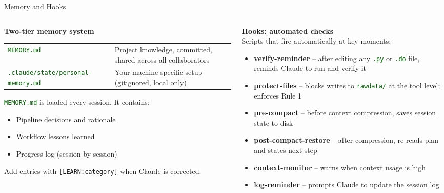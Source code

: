 \documentclass[aspectratio=169,11pt,dvipsnames]{beamer}
\newcommand{\file}[1]{\textcolor{darkgreen}{\nolinkurl{#1}}}
\begin{document}
\begin{frame}{Memory and Hooks}
  \begin{columns}[T]
    \begin{column}{0.48\textwidth}
      \textbf{Two-tier memory system}\\[4pt]
      \begin{tabular}{p{2cm}p{3.5cm}}
        \small\file{MEMORY.md} & \small Project knowledge, committed, shared across all collaborators \\[6pt]
        \small\file{.claude/state/personal-memory.md} & \small Your machine-specific setup (gitignored, local only) \\
      \end{tabular}
      \vspace{0.3cm}
      \file{MEMORY.md} is loaded every session. It contains:
      \begin{itemize}
        \item Pipeline decisions and rationale
        \item Workflow lessons learned
        \item Progress log (session by session)
      \end{itemize}
      \small Add entries with \texttt{[LEARN:category]} when Claude is corrected.
    \end{column}
    \begin{column}{0.48\textwidth}
      \textbf{Hooks: automated checks}\\[4pt]
      Scripts that fire automatically at key moments:
      \begin{itemize}\setlength\itemsep{4pt}
        \item \textbf{verify-reminder} -- after editing any \file{.py} or \file{.do} file, reminds Claude to run and verify it
        \item \textbf{protect-files} -- blocks writes to \file{rawdata/} at the tool level; enforces Rule 1
        \item \textbf{pre-compact} -- before context compression, saves session state to disk
        \item \textbf{post-compact-restore} -- after compression, re-reads plan and states next step
        \item \textbf{context-monitor} -- warns when context usage is high
        \item \textbf{log-reminder} -- prompts Claude to update the session log
      \end{itemize}
    \end{column}
  \end{columns}
\end{frame}
\end{document}

